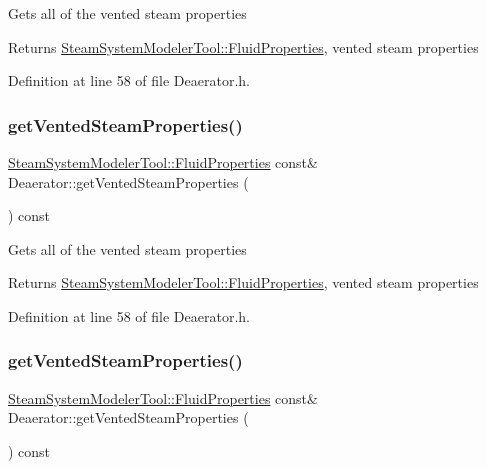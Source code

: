 Gets all of the vented steam properties \begin{DoxyReturn}{Returns}
\hyperlink{struct_steam_system_modeler_tool_1_1_fluid_properties}{Steam\+System\+Modeler\+Tool\+::\+Fluid\+Properties}, vented steam properties 
\end{DoxyReturn}


Definition at line 58 of file Deaerator.\+h.

\mbox{\label{class_deaerator_a576a4632452268f77839334d87d5abff}} 
\subsubsection{\texorpdfstring{get\+Vented\+Steam\+Properties()}{getVentedSteamProperties()}\hspace{0.1cm}{\footnotesize\ttfamily [2/3]}}
{\footnotesize\ttfamily \hyperlink{struct_steam_system_modeler_tool_1_1_fluid_properties}{Steam\+System\+Modeler\+Tool\+::\+Fluid\+Properties} const\& Deaerator\+::get\+Vented\+Steam\+Properties (\begin{DoxyParamCaption}{ }\end{DoxyParamCaption}) const\hspace{0.3cm}{\ttfamily [inline]}}

Gets all of the vented steam properties \begin{DoxyReturn}{Returns}
\hyperlink{struct_steam_system_modeler_tool_1_1_fluid_properties}{Steam\+System\+Modeler\+Tool\+::\+Fluid\+Properties}, vented steam properties 
\end{DoxyReturn}


Definition at line 58 of file Deaerator.\+h.

\mbox{\label{class_deaerator_a576a4632452268f77839334d87d5abff}} 
\subsubsection{\texorpdfstring{get\+Vented\+Steam\+Properties()}{getVentedSteamProperties()}\hspace{0.1cm}{\footnotesize\ttfamily [3/3]}}
{\footnotesize\ttfamily \hyperlink{struct_steam_system_modeler_tool_1_1_fluid_properties}{Steam\+System\+Modeler\+Tool\+::\+Fluid\+Properties} const\& Deaerator\+::get\+Vented\+Steam\+Properties (\begin{DoxyParamCaption}{ }\end{DoxyParamCaption}) const\hspace{0.3cm}{\ttfamily [inline]}}

